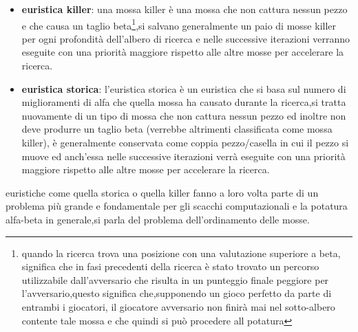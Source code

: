 \begin{itemize}
  \item  \textbf{euristica killer}: una mossa killer è una mossa che non cattura nessun pezzo e che causa un taglio beta\footnote{quando la ricerca trova 
  una posizione con una valutazione  superiore a beta, significa che in fasi precedenti della ricerca è stato trovato un percorso utilizzabile 
   dall'avversario che risulta in un punteggio finale peggiore per l'avversario,questo significa che,supponendo un gioco
   perfetto da parte di entrambi i giocatori, il giocatore avversario non finirà mai nel sotto-albero contente tale mossa e che quindi si 
   può procedere all potatura},si salvano generalmente un paio di mosse killer per ogni profondità dell'albero di ricerca e nelle successive iterazioni
   verranno eseguite con una priorità maggiore rispetto alle altre mosse per accelerare la ricerca. 
  \item \textbf{euristica storica}: l'euristica storica è un euristica che si basa sul numero di miglioramenti di alfa che quella mossa ha causato
   durante la ricerca,si tratta nuovamente di un tipo di mossa che non cattura nessun pezzo ed inoltre non deve produrre un taglio beta
  (verrebbe altrimenti classificata come mossa killer), è generalmente conservata come coppia pezzo/casella in cui il pezzo si muove 
  ed anch'essa  nelle successive iterazioni verrà eseguite con una priorità maggiore rispetto alle altre mosse per accelerare la ricerca. 
\end{itemize} 
euristiche come quella storica o quella killer fanno a loro volta parte di un problema più grande e fondamentale per gli scacchi computazionali 
e la potatura alfa-beta in generale,si parla del problema dell'ordinamento delle mosse.

